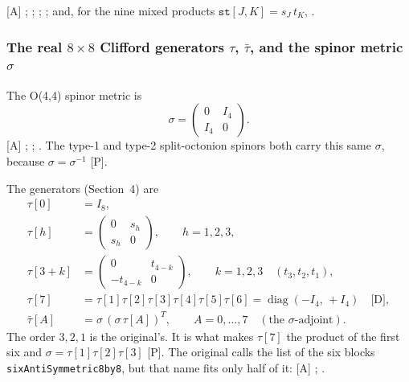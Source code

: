 [A] ; ;
; ; and, for the
nine mixed products $\texttt{st}[J,K]=s_J\,t_K$, .

\subsubsection{The real \texorpdfstring{$8\times8$}{8x8} Clifford generators \texorpdfstring{$\tau$, $\bar\tau$}{tau, taubar}, and the spinor metric \texorpdfstring{$\sigma$}{sigma}}
\label{fnd:tau}\label{sec:3.1.4}

The O(4,4) spinor metric is
\begin{equation}
  \sigma = \begin{pmatrix} 0 & I_4\\ I_4 & 0\end{pmatrix}.
\end{equation}
[A] ; ; . The
type-1 and type-2 split-octonion spinors both carry this same $\sigma$, because
$\sigma=\sigma^{-1}$ [P].

The generators (Section~4) are
\begin{align}
  \tau[0] &= I_8, \\
  \tau[h] &= \begin{pmatrix} 0 & s_h\\ s_h & 0\end{pmatrix}, \qquad h=1,2,3,\\
  \tau[3+k] &= \begin{pmatrix} 0 & t_{4-k}\\ -t_{4-k} & 0\end{pmatrix}, \qquad k=1,2,3\quad(t_3,t_2,t_1),\\
  \tau[7] &= \tau[1]\tau[2]\tau[3]\tau[4]\tau[5]\tau[6] = \operatorname{diag}(-I_4,\,+I_4)\quad\text{[D]},\\
  \bar\tau[A] &= \sigma\,(\sigma\,\tau[A])^{T},\qquad A=0,\dots,7\quad(\text{the $\sigma$-adjoint}).
\end{align}
The order $3,2,1$ is the original's. It is what makes $\tau[7]$ the product of the first six and
$\sigma=\tau[1]\tau[2]\tau[3]$ [P]. The original calls the list of the six blocks
\texttt{sixAntiSymmetric8by8}, but that name fits only half of it: [A]
;
.

